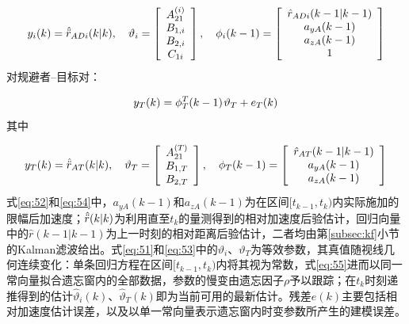 \begin{equation}
\label{eq:52}
{y_i}(k) = \hatddot{r}_{ADi}(k|k),\quad {\vartheta _i} = \left[ {\begin{array}{*{20}{c}}
  {A_{21}^{(i)}} \\ 
  {{B_{1,i}}} \\ 
  {{B_{2,i}}} \\ 
  {{C_{1i}}} 
\end{array}} \right],\quad {\phi _i}(k - 1) = \left[ {\begin{array}{*{20}{c}}
  {{{\hat r}_{ADi}}(k - 1|k - 1)} \\ 
  {{a_{yA}}(k - 1)} \\ 
  {{a_{zA}}(k - 1)} \\ 
  1 
\end{array}} \right]
\end{equation}
对规避者–目标对：

\begin{equation}
\label{eq:53}
{y_T}(k) = \phi _T^T(k - 1){\kern 1pt} {\vartheta _T} + {e_T}(k)
\end{equation}
其中

\begin{equation}
\label{eq:54}
{y_T}(k) = \hatddot{r}_{AT}(k|k),\quad {\vartheta _T} = \left[ {\begin{array}{*{20}{c}}
  {A_{21}^{(T)}} \\ 
  {{B_{1,T}}} \\ 
  {{B_{2,T}}} 
\end{array}} \right],\quad {\phi _T}(k - 1) = \left[ {\begin{array}{*{20}{c}}
  {{{\hat r}_{AT}}(k - 1|k - 1)} \\ 
  {{a_{yA}}(k - 1)} \\ 
  {{a_{zA}}(k - 1)} 
\end{array}} \right]
\end{equation}
式\eqref{eq:52}和\eqref{eq:54}中，${a_{yA}}(k - 1)$和${a_{zA}}(k - 1)$为在区间$[{t_{k - 1}},{t_k})$内实际施加的限幅后加速度；$\hat{\ddot{r}}(k|k)$为利用直至${t_k}$的量测得到的相对加速度后验估计，回归向量中的$\hat r(k - 1|k - 1)$为上一时刻的相对距离后验估计，二者均由第\ref{subsec:kf}小节的Kalman滤波给出。式\eqref{eq:51}和\eqref{eq:53}中的${\vartheta _i}$、${\vartheta _T}$为等效参数，其真值随视线几何连续变化：单条回归方程在区间$[{t_{k - 1}},{t_k})$内将其视为常数，式\eqref{eq:55}进而以同一常向量拟合遗忘窗内的全部数据，参数的慢变由遗忘因子$\rho $予以跟踪；在${t_k}$时刻递推得到的估计$\hat{\vartheta}_{i}(k)$、$\hat{\vartheta}_{T}(k)$即为当前可用的最新估计。残差$e(k)$主要包括相对加速度估计误差，以及以单一常向量表示遗忘窗内时变参数所产生的建模误差。

